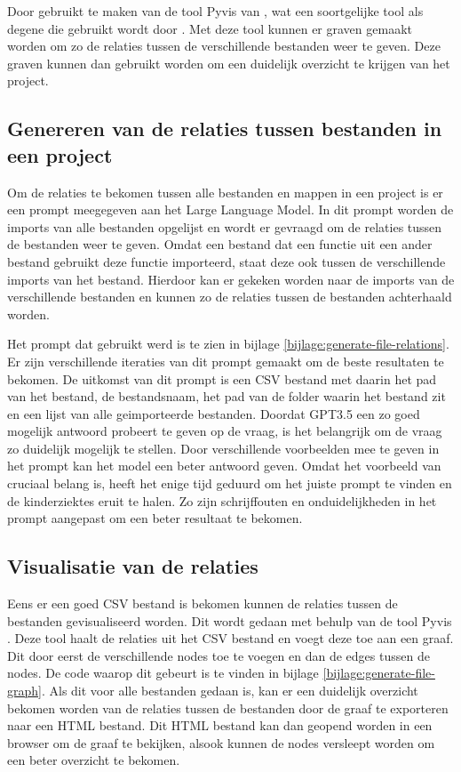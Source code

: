 Door gebruikt te maken van de tool Pyvis van \textcite{WHIR2018}, wat een soortgelijke tool als degene die gebruikt wordt door \textcite{Doxygen2023}.
Met deze tool kunnen er graven gemaakt worden om zo de relaties tussen de verschillende bestanden weer te geven.
Deze graven kunnen dan gebruikt worden om een duidelijk overzicht te krijgen van het project.

\subsection{Genereren van de relaties tussen bestanden in een project}
\label{subsec:project-documentatie-relaties-genereren}

Om de relaties te bekomen tussen alle bestanden en mappen in een project is er een prompt meegegeven aan het Large Language Model.
In dit prompt worden de imports van alle bestanden opgelijst en wordt er gevraagd om de relaties tussen de bestanden weer te geven.
Omdat een bestand dat een functie uit een ander bestand gebruikt deze functie importeerd, staat deze ook tussen de verschillende imports van het bestand.
Hierdoor kan er gekeken worden naar de imports van de verschillende bestanden en kunnen zo de relaties tussen de bestanden achterhaald worden.

Het prompt dat gebruikt werd is te zien in bijlage \ref{bijlage:generate-file-relations}.
Er zijn verschillende iteraties van dit prompt gemaakt om de beste resultaten te bekomen.
De uitkomst van dit prompt is een CSV bestand met daarin het pad van het bestand, de bestandsnaam, het pad van de folder waarin het bestand zit en een lijst van alle geimporteerde bestanden.
Doordat GPT3.5 \autocite{OpenAi2024} een zo goed mogelijk antwoord probeert te geven op de vraag, is het belangrijk om de vraag zo duidelijk mogelijk te stellen.
Door verschillende voorbeelden mee te geven in het prompt kan het model een beter antwoord geven.
Omdat het voorbeeld van cruciaal belang is, heeft het enige tijd geduurd om het juiste prompt te vinden en de kinderziektes eruit te halen.
Zo zijn schrijffouten en onduidelijkheden in het prompt aangepast om een beter resultaat te bekomen.

\subsection{Visualisatie van de relaties}
\label{subsec:project-documentatie-relaties-visualisatie}

Eens er een goed CSV bestand is bekomen kunnen de relaties tussen de bestanden gevisualiseerd worden.
Dit wordt gedaan met behulp van de tool Pyvis \autocite{WHIR2018}.
Deze tool haalt de relaties uit het CSV bestand en voegt deze toe aan een graaf. 
Dit door eerst de verschillende nodes toe te voegen en dan de edges tussen de nodes. 
De code waarop dit gebeurt is te vinden in bijlage \ref{bijlage:generate-file-graph}.
Als dit voor alle bestanden gedaan is, kan er een duidelijk overzicht bekomen worden van de relaties tussen de bestanden door de graaf te exporteren naar een HTML bestand.
Dit HTML bestand kan dan geopend worden in een browser om de graaf te bekijken, alsook kunnen de nodes versleept worden om een beter overzicht te bekomen.

